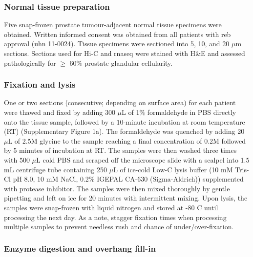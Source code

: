 \subsubsection{Normal tissue preparation}

Five snap-frozen prostate tumour-adjacent normal tissue specimens were obtained.
Written informed consent was obtained from all patients with \gls{reb} approval (\gls{uhn} 11-0024).
Tissue specimens were sectioned into 5, 10, and 20 $\mu$m sections.
Sections used for Hi-C and \gls{rnaseq} were stained with H\&E and assessed pathologically for $\ge$ 60\% prostate glandular cellularity.

\subsubsection{Fixation and lysis}

One or two sections (consecutive; depending on surface area) for each patient were thawed and fixed by adding 300 $\mu$L of 1\% formaldehyde in PBS directly onto the tissue sample, followed by a 10-minute incubation at room temperature (RT) (Supplementary Figure 1a).
The formaldehyde was quenched by adding 20 $\mu$L of 2.5M glycine to the sample reaching a final concentration of 0.2M followed by 5 minutes of incubation at RT.
The samples were then washed three times with 500 $\mu$L cold PBS and scraped off the microscope slide with a scalpel into 1.5 mL centrifuge tube containing 250 $\mu$L of ice-cold Low-C lysis buffer (10 mM Tris-Cl pH 8.0, 10 mM NaCl, 0.2\% IGEPAL CA-630 (Sigma-Aldrich)) supplemented with protease inhibitor.
The samples were then mixed thoroughly by gentle pipetting and left on ice for 20 minutes with intermittent mixing.
Upon lysis, the samples were snap-frozen with liquid nitrogen and stored at -80 \textdegree C until processing the next day.
As a note, stagger fixation times when processing multiple samples to prevent needless rush and chance of under/over-fixation.

\subsubsection{Enzyme digestion and overhang fill-in}

